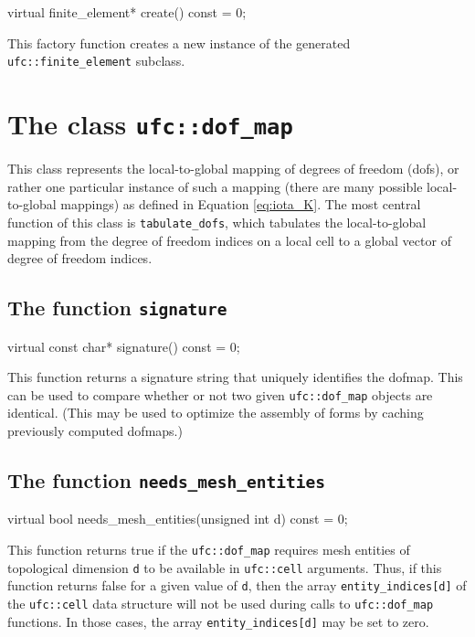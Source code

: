 \begin{code}
virtual finite_element* create() const = 0;
\end{code}

This factory function creates a new instance of the generated
\texttt{ufc::finite\_\-element} subclass.

\section{The class \texttt{ufc::dof\_map}}

This class represents the local-to-global mapping of degrees of
freedom (dofs), or rather one particular instance of such a mapping
(there are many possible local-to-global mappings) as defined in
Equation \eqref{eq:iota_K}. The most central function of this class is
\texttt{tabulate\_dofs}, which tabulates the local-to-global mapping
from the degree of freedom indices on a local cell to a global vector of
degree of freedom indices.

\subsection{The function \texttt{signature}}

\begin{code}
virtual const char* signature() const = 0;
\end{code}

This function returns a signature string that uniquely identifies the
dofmap. This can be used to compare whether or not two given
\texttt{ufc::dof\_map} objects are identical. (This may be used to
optimize the assembly of forms by caching previously computed
dofmaps.)

\subsection{The function \texttt{needs\_mesh\_entities}}

\begin{code}
virtual bool needs_mesh_entities(unsigned int d) const = 0;
\end{code}

This function returns true if the \texttt{ufc::dof\_map} requires mesh
entities of topological dimension \texttt{d} to be available in
\texttt{ufc::cell} arguments. Thus, if this function returns false for
a given value of \texttt{d}, then the array
\texttt{entity\_indices[d]} of the \texttt{ufc::cell} data structure
will not be used during calls to \texttt{ufc::dof\_map} functions. In
those cases, the array \texttt{entity\_indices[d]} may be set to zero.

